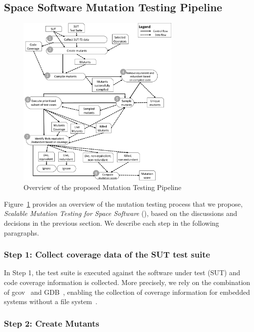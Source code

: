 \subsection{Space Software Mutation Testing Pipeline}
\label{sec:approach}

\begin{figure}[tb]
\begin{center}
\includegraphics[width=8cm]{images/Approach}
\caption{Overview of the proposed Mutation Testing Pipeline}
\label{fig:approach}
\end{center}
\end{figure}

Figure~\ref{fig:approach} provides an overview of the mutation testing process that we propose, 
\emph{Scalable Mutation Testing for Space Software} (\APPR), based on the discussions and decisions in the previous section. We describe each step in the following paragraphs. 

\subsubsection{Step 1: Collect coverage data of the SUT test suite}

In Step 1, the test suite is executed against the software under test (SUT) and code coverage information is collected. 
More precisely, we rely on the combination of gcov~\cite{GCOV}
and GDB~\cite{GDB}, enabling the collection of coverage information for embedded systems without a file system~\cite{THANASSIS}.

\subsubsection{Step 2: Create Mutants}

